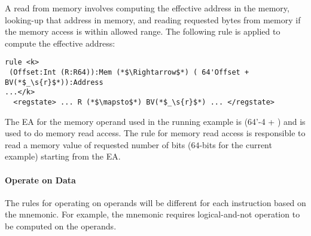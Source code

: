 A read from memory involves computing the effective address in the memory, looking-up that address in memory, and reading requested bytes from memory if the memory access is within allowed range.
The following rule is applied to compute the effective address:
\begin{lstlisting}[style=KRULE]
rule <k> 
 (Offset:Int (R:R64)):Mem (*$\Rightarrow$*) ( 64'Offset + BV(*$_\s{r}$*)):Address
...</k>
  <regstate> ... R (*$\mapsto$*) BV(*$_\s{r}$*) ... </regstate>
\end{lstlisting}
 The EA for the memory operand used in the running example is (64'-4 + ) and is used to do memory read access. The rule for memory read access is responsible to read a memory value of requested number of bits ($64$-bits for the current example) starting from the EA. 
 
\paragraph{Operate on Data}
The rules for operating on operands will be different for each instruction based on the mnemonic. For example, the mnemonic  requires logical-and-not operation to be computed on the operands.

